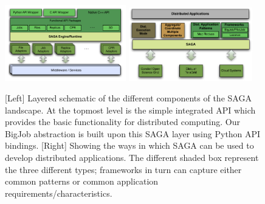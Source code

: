 \documentclass{rspublic}
\begin{document}
\begin{figure}[!ht]
 \begin{center}
     \includegraphics[width=0.47\textwidth]{stci_saga_figures-1.pdf}
    \includegraphics[width=0.48\textwidth]{distributed_applications_saga_figure.pdf}
\end{center}
\caption{\small [Left] Layered schematic of the different components
  of the SAGA landscape. At the topmost level is the simple integrated
  API which provides the basic functionality for distributed
  computing. Our BigJob abstraction is built upon this SAGA layer
  using Python API bindings. [Right] Showing the ways in which SAGA
  can be used to develop distributed applications. The different
  shaded box represent the three different types; frameworks in turn
  can capture either common patterns or common application
  requirements/characteristics.} \label{Fig:SAGA1}
\end{figure}
\end{document}
